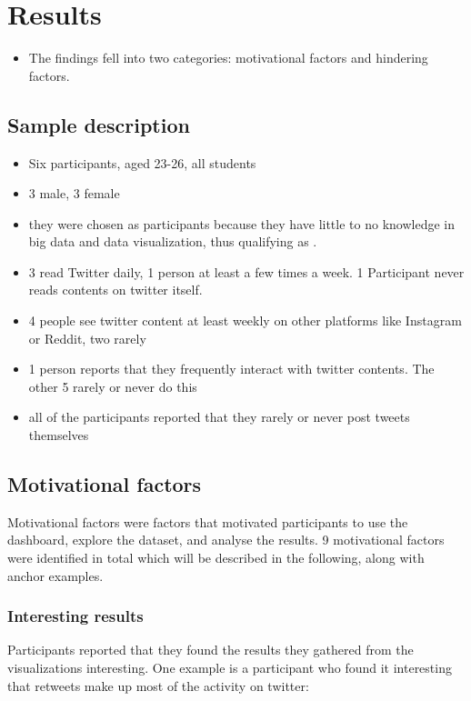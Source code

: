 \section{Results}
\begin{itemize}
    \item The findings fell into two categories: motivational factors and hindering factors.
\end{itemize}

\subsection{Sample description}
\begin{itemize}
    \item Six participants, aged 23-26, all students
    \item 3 male, 3 female
    \item they were chosen as participants because they have little to no knowledge in big data and data visualization, thus qualifying as .
    \item 3 read Twitter daily, 1 person at least a few times a week. 1 Participant never reads contents on twitter itself.
    \item 4 people see twitter content at least weekly on other platforms like Instagram or Reddit, two rarely
    \item 1 person reports that they frequently interact with twitter contents. The other 5 rarely or never do this
    \item all of the participants reported that they rarely or never post tweets themselves
\end{itemize}

\subsection{Motivational factors}
Motivational factors were factors that motivated participants to use the dashboard, explore the dataset, and analyse the results. 9 motivational factors were identified in total which will be described in the following, along with anchor examples.

\subsubsection*{Interesting results}
Participants reported that they found the results they gathered from the visualizations interesting. One example is a participant who found it interesting that retweets make up most of the activity on twitter:

